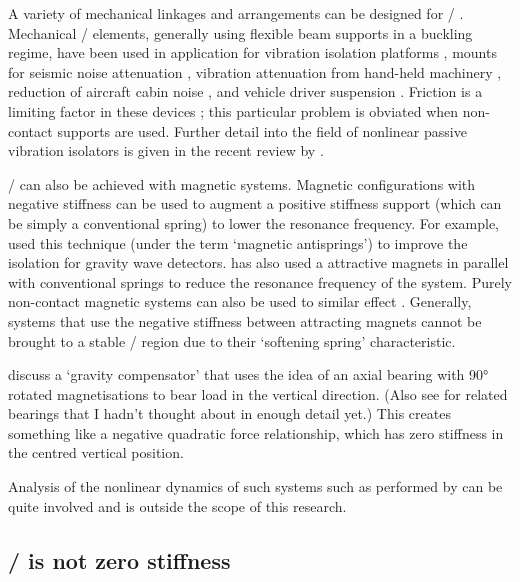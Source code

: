 A variety of mechanical linkages and arrangements can be designed for \qzs/ \cite{tarnai2003}.
Mechanical \qzs/ elements, generally using flexible beam supports in a buckling regime, have been used in application for vibration isolation platforms \cite{platus1999}, mounts for seismic noise attenuation \cite{cella2005}, vibration attenuation from hand-held machinery \cite{sokolov2007}, reduction of aircraft cabin noise \cite{baklanov2007-jsv}, and vehicle driver suspension \cite{lee2007-jsv}.
Friction is a limiting factor in these devices \cite{sokolov2007}; this particular problem is obviated when non-contact supports are used.
Further detail into the field  of nonlinear passive vibration isolators is given in the recent review by \textcite{ibrahim2008}.

\QZS/ can also be achieved with magnetic systems.
Magnetic configurations with negative stiffness can be used to augment a positive stiffness support (which can be simply a conventional spring) to lower the resonance frequency.
For example, \textcite{beccaria1997} used this technique (under the term `magnetic antisprings') to improve the isolation for gravity wave detectors.
\textcite{carrella2007-euromech,carrella2008-thesis} has also used a attractive magnets in parallel with conventional springs to reduce the resonance frequency of the system.
Purely non-contact magnetic systems can also be used to similar effect \cite{robertson2006,robertson2007}.
Generally, systems that use the negative stiffness between attracting magnets cannot be brought to a stable \qzs/ region due to their `softening spring' characteristic.

\textcite{hol2006} discuss a `gravity compensator' that uses the idea of an axial bearing with \ang{90} rotated magnetisations to bear load in the vertical direction.
(Also see \textcite{yonnet1981} for related bearings that I hadn't thought about in enough detail yet.)
This creates something like a negative quadratic force relationship, which has zero stiffness in the centred vertical position.

Analysis of the nonlinear dynamics of such systems such as performed by \textcite{lee2004-jsv,kovacic2008,kovacic2009} can be quite involved and is outside the scope of this research.


\subsection{\QZS/ is not zero stiffness}

